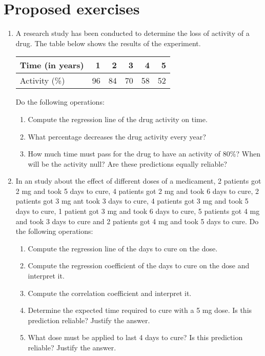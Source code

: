 \section{Proposed exercises}
\begin{enumerate}[leftmargin=*]
\item A research study has been conducted to determine the loss of activity of a drug.
The table below shows the results of the experiment.

\begin{center}
\begin{tabular}{|l|r|r|r|r|r|}
\hline
Time (in years) & 1 & 2 & 3 & 4 & 5 \\ \hline
Activity (\%) & 96 & 84 & 70 & 58 & 52 \\ \hline
\end{tabular}
\end{center}
Do the following operations:
\begin{enumerate}
\item Compute the regression line of the drug activity on time.
\item What percentage decreases the drug activity every year?  
\item How much time must pass for the drug to have an activity of 80\%? When will be the activity null?
Are these predictions equally reliable?
\end{enumerate}

\item In an study about the effect of different doses of a medicament, 2 patients got 2 mg and took 5 days to cure, 4
patients got 2 mg and took 6 days to cure, 2 patients got 3 mg ant took 3 days to cure, 4 patients got 3 mg and took 5
days to cure, 1 patient got 3 mg and took 6 days to cure, 5 patients got 4 mg and took 3 days to cure and 2 patients got
4 mg and took 5 days to cure. 
Do the following operations:
\begin{enumerate}
\item Compute the regression line of the days to cure on the dose.
\item Compute the regression coefficient of the days to cure on the dose and interpret it.
\item Compute the correlation coefficient and interpret it.
\item Determine the expected time required to cure with a 5 mg dose.
Is this prediction reliable? Justify the answer.
\item What dose must be applied to last 4 days to cure? 
Is this prediction reliable? Justify the answer.
\end{enumerate}


\end{enumerate}
